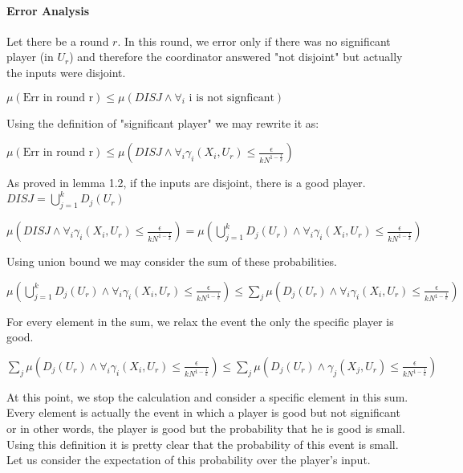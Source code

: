 \documentclass{article}
\theoremstyle{plain}
\begin{document}
\paragraph{Error Analysis}
Let there be a round $r$. In this round, we error only if there was no significant player (in $U_r$) and therefore the coordinator answered "not disjoint" but actually the inputs were disjoint. \newline

$\mu(\text{Err in round r}) \leq \mu(DISJ \land \forall_i \text{ i is not signficant})$ \newline

Using the definition of "significant player" we may rewrite it as: \newline

$\mu(\text{Err in round r}) \leq \mu(DISJ \land \forall_i \gamma_i(X_i, U_r) \leq \frac{\epsilon}{kN^{1-\frac{1}{k}}})$ \newline

As proved in lemma 1.2, if the inputs are disjoint, there is a good player. $DISJ = \bigcup_{j = 1}^k D_j(U_r)$ \newline

$ \mu(DISJ \land \forall_i \gamma_i(X_i, U_r) \leq \frac{\epsilon}{kN^{1-\frac{1}{k}}}) = \mu(\bigcup_{j = 1}^k D_j(U_r) \land \forall_i \gamma_i(X_i, U_r) \leq \frac{\epsilon}{kN^{1-\frac{1}{k}}})$ \newline

Using union bound we may consider the sum of these probabilities. \newline

$ \mu(\bigcup_{j = 1}^k D_j(U_r) \land \forall_i \gamma_i(X_i, U_r) \leq \frac{\epsilon}{kN^{1-\frac{1}{k}}}) \leq \sum_j \mu(D_j(U_r) \land \forall_i \gamma_i(X_i, U_r) \leq \frac{\epsilon}{kN^{1-\frac{1}{k}}})$ \newline

For every element in the sum, we relax the event the only the specific player is good. \newline

$\sum_j \mu(D_j(U_r) \land \forall_i \gamma_i(X_i, U_r) \leq \frac{\epsilon}{kN^{1-\frac{1}{k}}}) \leq \sum_j \mu(D_j(U_r) \land \gamma_j(X_j, U_r) \leq \frac{\epsilon}{kN^{1-\frac{1}{k}}})$ \newline

At this point, we stop the calculation and consider a specific element in this sum. Every element is actually the event in which a player is good but not significant or in other words, the player is good but the probability that he is good is small. Using this definition it is pretty clear that the probability of this event is small. \newline
Let us consider the expectation of this probability over the player's input. \newline
\end{document}
